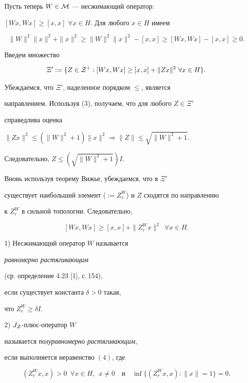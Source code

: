 Пусть теперь $W\in {\cal M}$ --- несжимающий оператор:


$[Wx,Wx]\geq [x,x]$ $\forall x\in H$. Для любого $x\in H$ имеем


\begin{equation}


\| W\|^{2}\| x\|^{2}+\| x\|^{2}\geq


\| W\|^{2}\| x\|^{2}-[x,x]\geq [Wx,Wx]-[x,x]\geq 0.


\end{equation}


Введем множество


$$


\Xi':=\{Z\in {\cal Z}^{+}: [Wx,Wx]\geq [x,x]+\| Zx\|^{2}


\ \forall x\in H\}.


$$


Убеждаемся, что $\Xi'$, наделенное порядком $\leq$, является


направлением. Используя (3), получаем, что для любого $Z\in\Xi'$


справедлива оценка


$\| Zx\|^{2}\leq (\| W\|^{2}+1)\| x\|^{2}\Rightarrow


\| Z\|\leq \sqrt{\| W\|^{2}+1}$.


Следовательно, $Z\leq (\sqrt{\| W\|^{2}+1})I$.


Вновь используя теорему Вижье, убеждаемся, что в $\Xi'$


существует наибольший элемент ($:=Z_{r}^{W}$) и $Z$ сходятся по направлению


к $Z^{W}_{r}$ в сильной топологии. Следовательно,


\begin{equation}


[Wx,Wx]\geq [x,x]+\| Z_{r}^{W}x\|^{2} \ \; \forall x\in H.


\end{equation}





\begin{defn}


1) Несжимающий оператор $W$ называется


{\it равномерно растягивающим}


(ср. определение 4.23 [1], с.\,154),


если существует константа $\delta >0$ такая,


что $Z_{r}^{W}\geq\delta I$.





2) $J_{\cal Z}$-плюс-оператор $W$


называется {\it полуравномерно растягивающим},


если выполняется неравенство $(4)$, где


$$


(Z_{r}^{W}x,x)>0\ \; \forall x\in H,\ \ x\ne0\quad \text{и}\quad


\inf\{(Z_{r}^{W}x,x): \| x\| =1\}=0.


$$


\end{defn}





